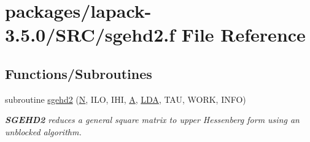 \hypertarget{sgehd2_8f}{}\section{packages/lapack-\/3.5.0/\+S\+R\+C/sgehd2.f File Reference}
\label{sgehd2_8f}
\subsection*{Functions/\+Subroutines}
\begin{DoxyCompactItemize}
\item 
subroutine \hyperlink{group__realGEcomputational_ga08e8e4fef5295cd00f6762994a817e60}{sgehd2} (\hyperlink{polmisc_8c_a0240ac851181b84ac374872dc5434ee4}{N}, I\+L\+O, I\+H\+I, \hyperlink{classA}{A}, \hyperlink{example__user_8c_ae946da542ce0db94dced19b2ecefd1aa}{L\+D\+A}, T\+A\+U, W\+O\+R\+K, I\+N\+F\+O)
\begin{DoxyCompactList}\small\item\em {\bfseries S\+G\+E\+H\+D2} reduces a general square matrix to upper Hessenberg form using an unblocked algorithm. \end{DoxyCompactList}\end{DoxyCompactItemize}
